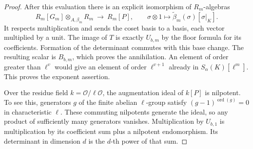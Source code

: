 \documentclass[a4paper,11pt]{article}
\theoremstyle{definition}
\theoremstyle{remark}
\numberwithin{equation}{section}
\newcommand{\OO}{\mathcal O}
\begin{document}
\begin{proof}
After this evaluation there is an explicit isomorphism of \(R_m\)-algebras
\[
 R_m[G_m]\otimes_{A,\beta_m}R_m\ \longrightarrow\ R_m[P],
 \qquad \sigma\otimes1\longmapsto
                    \widetilde\beta_m(\sigma)[\sigma|_K].
\]
It respects multiplication and sends the coset basis to a basis, each vector multiplied by a unit. The image of \(T\) is exactly \(U_{b,m}\) by the floor formula for its coefficients. Formation of the determinant commutes with this base change. The resulting scalar is \(B_{b,m}\), which proves the annihilation. An element of order greater than \(\ell^v\) would give an element of order \(\ell^{v+1}\) already in \(S_\alpha(K)[\ell^m]\). This proves the exponent assertion.

Over the residue field \(k=\OO/\ell\OO\), the augmentation ideal of \(k[P]\) is nilpotent. To see this, generators \(g\) of the finite abelian \(\ell\)-group satisfy \((g-1)^{\operatorname{ord}(g)}=0\) in characteristic \(\ell\). These commuting nilpotents generate the ideal, so any product of sufficiently many generators vanishes. Multiplication by \(U_{b,1}\) is multiplication by its coefficient sum plus a nilpotent endomorphism. Its determinant in dimension \(d\) is the \(d\)-th power of that sum.
\end{proof}
\end{document}
